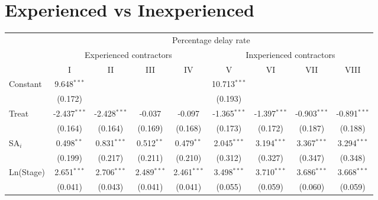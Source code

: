 \documentclass[
]{article}
\begin{document}
\hypertarget{experienced-vs-inexperienced}{%
\section{Experienced vs
Inexperienced}\label{experienced-vs-inexperienced}}

\begingroup
\centering
\small
\begin{tabular}{lcccccccc}
   \toprule
    & \multicolumn{8}{c}{Percentage delay rate}\\
    & \multicolumn{4}{c}{Experienced contractors} & \multicolumn{4}{c}{Inxperienced contractors} \\ \cmidrule(lr){2-5} \cmidrule(lr){6-9}
                                         & I              & II             & III           & IV            & V              & VI             & VII            & VIII\\  
   Constant                              & 9.648$^{***}$  &                &               &               & 10.713$^{***}$ &                &                &   \\   
                                         & (0.172)        &                &               &               & (0.193)        &                &                &   \\   
   Treat                                 & -2.437$^{***}$ & -2.428$^{***}$ & -0.037        & -0.097        & -1.365$^{***}$ & -1.397$^{***}$ & -0.903$^{***}$ & -0.891$^{***}$\\   
                                         & (0.164)        & (0.164)        & (0.169)       & (0.168)       & (0.173)        & (0.172)        & (0.187)        & (0.188)\\   
   SA$_i$                                & 0.498$^{**}$   & 0.831$^{***}$  & 0.512$^{**}$  & 0.479$^{**}$  & 2.045$^{***}$  & 3.194$^{***}$  & 3.367$^{***}$  & 3.294$^{***}$\\   
                                         & (0.199)        & (0.217)        & (0.211)       & (0.210)       & (0.312)        & (0.327)        & (0.347)        & (0.348)\\   
   Ln(Stage)                             & 2.651$^{***}$  & 2.706$^{***}$  & 2.489$^{***}$ & 2.461$^{***}$ & 3.498$^{***}$  & 3.710$^{***}$  & 3.686$^{***}$  & 3.668$^{***}$\\   
                                         & (0.041)        & (0.043)        & (0.041)       & (0.041)       & (0.055)        & (0.059)        & (0.060)        & (0.059)\\   

\end{tabular}
\end{document}
